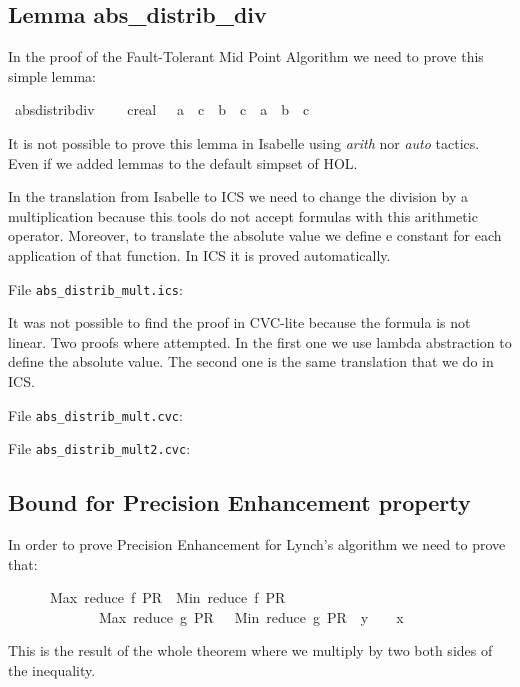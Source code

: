 \documentclass[11pt,a4paper]{article}
\begin{document}
\subsection{Lemma abs\_distrib\_div}
\label{sec:abs_distrib_mult}

In the proof of the Fault-Tolerant Mid Point Algorithm we need to
prove this simple lemma:

\begin{isabellebody}%
\isamarkuptrue%
\ abs{\isacharunderscore}distrib{\isacharunderscore}div{\isacharcolon}\isanewline
\ \ {\isachardoublequote}{}\ {\isacharless}\ {\isacharparenleft}c{\isacharcolon}{\isacharcolon}real{\isacharparenright}\ \ {\isasymLongrightarrow}\ {\isasymbar}a\ {\isacharslash}\ c\ {\isacharminus}\ b\ {\isacharslash}\ c{\isasymbar}\ {\isacharequal}\ {\isasymbar}a\ {\isacharminus}\ b{\isasymbar}\ {\isacharslash}\ c{\isachardoublequote}\isanewline
\isamarkupfalse%
\end{isabellebody}%
It is not possible to prove this lemma in Isabelle using \emph{arith} nor
\emph{auto} tactics. Even if we added lemmas to the default simpset of
HOL. 

In the translation from Isabelle to ICS we need to change the division
by a multiplication because this tools do not accept formulas with this
arithmetic operator.  Moreover, to translate the absolute value we
define e constant for each application of that function.
In ICS it is proved automatically. 

File \verb|abs_distrib_mult.ics|:


It was not possible to find the proof in CVC-lite because the
formula is not linear. Two proofs where attempted. In the first one we
use lambda abstraction to define the absolute value. The second one is
the same translation that we do in ICS.

File \verb|abs_distrib_mult.cvc|:


File \verb|abs_distrib_mult2.cvc|:


\subsection{Bound for Precision Enhancement property}
\label{sec:bound_prec_enh}

In order to prove Precision Enhancement for Lynch's algorithm we need
to prove that:

\begin{isabellebody}%
\ \ \ \ \ \ {\isachardoublequote}{\isasymbar}Max\
{\isacharparenleft}reduce\ f\ PR{\isacharparenright}\ {\isacharplus}\
Min\ {\isacharparenleft}reduce\ f\
PR{\isacharparenright}\ \ {\isacharplus}\ 
\isanewline
\ \ \ \ \ \ \ \ \ \ \ \ {\isacharminus}\
Max\
{\isacharparenleft}reduce\ g\ PR{\isacharparenright}\ {\isacharplus}\ {\isacharminus}\
Min\ {\isacharparenleft}reduce\ g\
PR{\isacharparenright}{\isasymbar}\ {\isacharless}{\isacharequal}\ y\
{\isacharplus}\ {}\ {\isacharasterisk}\
x{\isachardoublequote}
\end{isabellebody}%
This is the result of the whole theorem where we multiply by two both
sides of the inequality.
\end{document}
